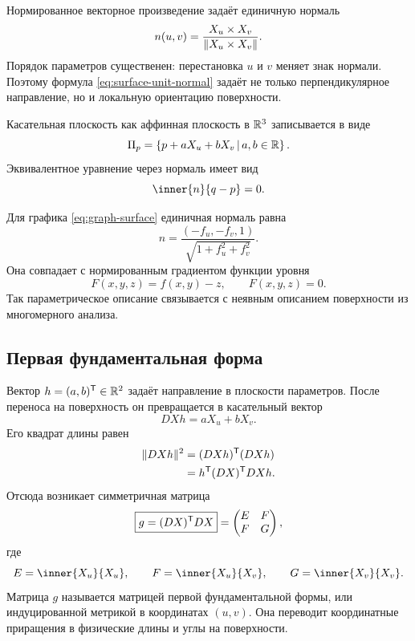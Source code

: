 Нормированное векторное произведение задаёт единичную нормаль
\begin{equation}
\label{eq:surface-unit-normal}
n(u,v)
=\frac{X_u\times X_v}{\lVert X_u\times X_v\rVert}.
\end{equation}
Порядок параметров существенен: перестановка \(u\) и \(v\) меняет знак нормали. Поэтому формула \eqref{eq:surface-unit-normal} задаёт не только перпендикулярное направление, но и локальную ориентацию поверхности.

Касательная плоскость как аффинная плоскость в \(\mathbb{R}^3\) записывается в виде
\begin{equation}
\label{eq:surface-affine-tangent-plane}
\Pi_p
=\left\{p+aX_u+bX_v\,\middle|\,a,b\in\mathbb{R}\right\}.
\end{equation}
Эквивалентное уравнение через нормаль имеет вид
\[
\inner{n}{q-p}=0.
\]

Для графика \eqref{eq:graph-surface} единичная нормаль равна
\begin{equation}
\label{eq:graph-unit-normal}
n
=\frac{(-f_u,-f_v,1)}{\sqrt{1+f_u^2+f_v^2}}.
\end{equation}
Она совпадает с нормированным градиентом функции уровня
\[
F(x,y,z)=f(x,y)-z,
\qquad
F(x,y,z)=0.
\]
Так параметрическое описание связывается с неявным описанием поверхности из многомерного анализа.

\subsection{Первая фундаментальная форма}

Вектор \(h=(a,b)^{\mathsf{T}}\in\mathbb{R}^2\) задаёт направление в плоскости параметров. После переноса на поверхность он превращается в касательный вектор
\[
D Xh=aX_u+bX_v.
\]
Его квадрат длины равен
\begin{equation}
\label{eq:induced-metric-derivation}
\begin{aligned}
\lVert D Xh\rVert^2
&=(D Xh)^{\mathsf{T}}(D Xh)\\
&=h^{\mathsf{T}}(D X)^{\mathsf{T}}D Xh.
\end{aligned}
\end{equation}
Отсюда возникает симметричная матрица
\begin{equation}
\label{eq:first-fundamental-form-matrix}
\boxed{
g=(D X)^{\mathsf{T}}D X
}
=
\begin{pmatrix}
E&F\\
F&G
\end{pmatrix},
\end{equation}
где
\begin{equation}
\label{eq:first-fundamental-form-coefficients}
E=\inner{X_u}{X_u},
\qquad
F=\inner{X_u}{X_v},
\qquad
G=\inner{X_v}{X_v}.
\end{equation}
Матрица \(g\) называется матрицей первой фундаментальной формы, или индуцированной метрикой в координатах \((u,v)\). Она переводит координатные приращения в физические длины и углы на поверхности.

